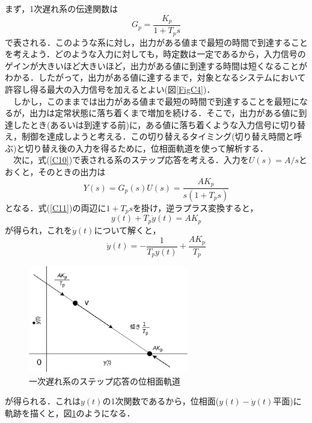 \documentclass[12pt]{jsarticle}
\begin{document}
  まず，1次遅れ系の伝達関数は
\begin{equation}
\label{C10}
G_p = \frac{K_p}{1+T_ps}
\end{equation}
で表される．このような系に対し，出力がある値まで最短の時間で到達することを考えよう．どのような入力に対しても，時定数は一定であるから，入力信号のゲインが大きいほど大きいほど，出力がある値に到達する時間は短くなることがわかる．したがって，出力がある値に達するまで，対象となるシステムにおいて許容し得る最大の入力信号を加えるとよい(図\ref{FigC4})．\\
　しかし，このままでは出力がある値まで最短の時間で到達することを最短になるが，出力は定常状態に落ち着くまで増加を続ける．そこで，出力がある値に到達したとき(あるいは到達する前)に，ある値に落ち着くような入力信号に切り替え，制御を達成しようと考える．この切り替えるタイミング(切り替え時間と呼ぶ)と切り替え後の入力を得るために，位相面軌道を使って解析する．\\
　次に，式(\ref{C10})で表される系のステップ応答を考える．入力を$U(s)=A/s$とおくと，そのときの出力は
\begin{equation}
\label{C11}
Y(s) = G_p(s)U(s) = \frac{AK_p}{s(1+T_ps)}
\end{equation}
となる．式(\ref{C11})の両辺に$1+T_ps$を掛け，逆ラプラス変換すると，
\begin{equation}
\label{C12}
y(t) + T_p\dot{y}(t) = AK_p
\end{equation}
が得られ，これを$\dot{y}(t)$について解くと，
\begin{equation}
\label{C13}
\dot{y}(t) = -\frac{1}{T_py(t)} + \frac{AK_p}{T_p}
\end{equation}
\begin{figure}[tb]
  \begin{center}
    \includegraphics[clip,width=7.0cm]{../Img/FigC5.eps}
    \caption{一次遅れ系のステップ応答の位相面軌道}
    \label{FigC5}
  \end{center}
\end{figure}
が得られる．これは$y(t)$の1次関数であるから，位相面($y(t)-\dot{y}(t)$平面)に軌跡を描くと，図\ref{FigC5}のようになる．\\
\end{document}
